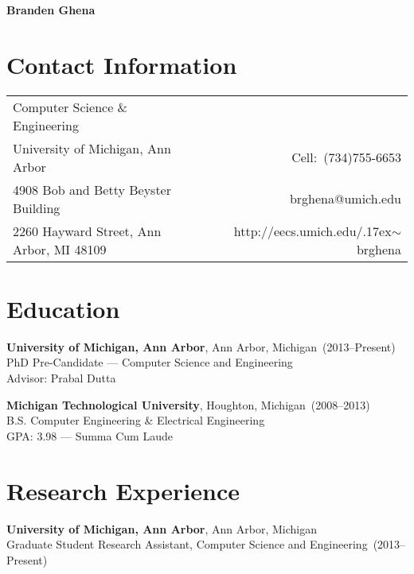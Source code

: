 \documentclass{article}
\begin{document}

\nocite{*}

\begin{center}
    \Huge{\bf{Branden Ghena}}
\end{center}

\section*{Contact Information}

\begin{table}[H]
\centering
\vspace*{-16pt}
\begin{tabularx}{\linewidth}{@{} X r @{}}
    {Computer Science \& Engineering}     & {} \\
    {University of Michigan, Ann Arbor}   & {Cell:~(734)755-6653} \\
    {4908 Bob and Betty Beyster Building} & {brghena@umich.edu} \\
    {2260 Hayward Street, Ann Arbor, MI 48109} & {http://eecs.umich.edu/{\raise.17ex\hbox{$\scriptstyle\sim$}}brghena} \\
\end{tabularx}
\end{table}


\section*{Education}
\vspace{-6pt}

{\bf University of Michigan, Ann Arbor}, Ann Arbor, Michigan~(2013--Present) \\
PhD Pre-Candidate --- Computer Science and Engineering \\
Advisor: Prabal Dutta

{\bf Michigan Technological University}, Houghton, Michigan~(2008--2013) \\
B.S. Computer Engineering \& Electrical Engineering \\
GPA: 3.98 --- Summa Cum Laude


\section*{Research Experience}
\vspace{-6pt}

{\bf University of Michigan, Ann Arbor}, Ann Arbor, Michigan \\
Graduate Student Research Assistant, Computer Science and Engineering~(2013--Present)
\end{document}
